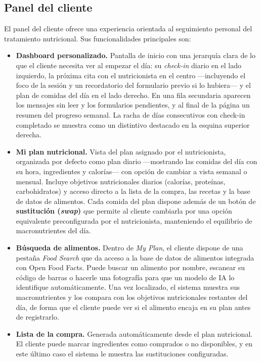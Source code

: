 \subsection{Panel del cliente}

El panel del cliente ofrece una experiencia orientada al seguimiento personal del tratamiento nutricional. Sus funcionalidades principales son:

\begin{itemize}
    \item \textbf{Dashboard personalizado.} Pantalla de inicio con una jerarquía clara de lo que el cliente necesita ver al empezar el día: su \textit{check-in} diario en el lado izquierdo, la próxima cita con el nutricionista en el centro ---incluyendo el foco de la sesión y un recordatorio del formulario previo si lo hubiera--- y el plan de comidas del día en el lado derecho. En una fila secundaria aparecen los mensajes sin leer y los formularios pendientes, y al final de la página un resumen del progreso semanal. La racha de días consecutivos con check-in completado se muestra como un distintivo destacado en la esquina superior derecha.

    \item \textbf{Mi plan nutricional.} Vista del plan asignado por el nutricionista, organizada por defecto como plan diario ---mostrando las comidas del día con su hora, ingredientes y calorías--- con opción de cambiar a vista semanal o mensual. Incluye objetivos nutricionales diarios (calorías, proteínas, carbohidratos) y acceso directo a la lista de la compra, las recetas y la base de datos de alimentos. Cada comida del plan dispone además de un botón de \textbf{sustitución (\textit{swap})} que permite al cliente cambiarla por una opción equivalente preconfigurada por el nutricionista, manteniendo el equilibrio de macronutrientes del día.

    \item \textbf{Búsqueda de alimentos.} Dentro de \textit{My Plan}, el cliente dispone de una pestaña \textit{Food Search} que da acceso a la base de datos de alimentos integrada con Open Food Facts. Puede buscar un alimento por nombre, escanear su código de barras o hacerle una fotografía para que un modelo de IA lo identifique automáticamente. Una vez localizado, el sistema muestra sus macronutrientes y los compara con los objetivos nutricionales restantes del día, de forma que el cliente puede ver si el alimento encaja en su plan antes de registrarlo.

    \item \textbf{Lista de la compra.} Generada automáticamente desde el plan nutricional. El cliente puede marcar ingredientes como comprados o no disponibles, y en este último caso el sistema le muestra las sustituciones configuradas.


\end{itemize}

